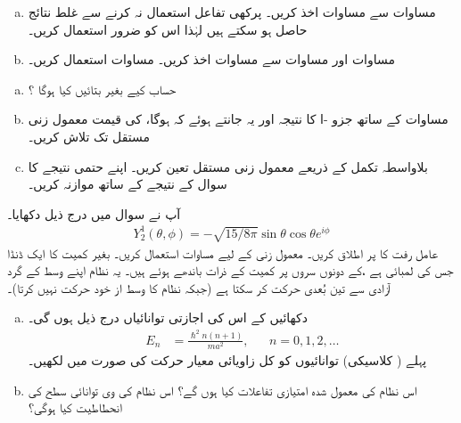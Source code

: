 \begin{enumerate}[a.]
\item
مساوات  سے مساوات   اخذ کریں۔  پرکھی تفاعل  استعمال نہ کرنے سے غلط نتائج حاصل ہو سکتے ہیں لہٰذا اس کو ضرور استعمال کریں۔ 
\item
مساوات  اور مساوات   سے مساوات    اخذ کریں۔   مساوات    استعمال کریں۔ 
\end{enumerate}
\begin{enumerate}[a.]
\item
حساب کیے بغیر بتائیں  کیا ہوگا ؟
\item
مساوات   کے ساتھ جزو -ا  کا نتیجہ اور یہ جانتے ہوئے کہ  ہوگا،   کی  قیمت معمول زنی مستقل    تک تلاش کریں۔ 
\item
بلاواسطہ تکمل کے ذریعے معمول زنی مستقل  تعین کریں۔ اپنے حتمی نتیجے کا سوال  کے نتیجے کے ساتھ موازنہ کریں۔ 
\end{enumerate} 
آپ نے سوال   میں درج ذیل دکھایا۔ 
\begin{align*} 
Y_2^1 (\theta , \phi) = - \sqrt{15/8 \pi} \sin \theta \cos \theta e^{i \phi}
\end{align*}
عامل رفت کا  پر اطلاق کریں۔ معمول زنی کے لیے مساوات   استعمال کریں۔ 
بغیر کمیت کا ایک ڈنڈا جس کی لمبائی  ہے ،کے دونوں سروں پر کمیت   کے ذرات باندھے ہوئے ہیں۔  یہ  نظام اپنے وسط کے گرد آزادی سے تین بُعدی حرکت کر سکتا ہے (جبکہ نظام کا وسط از  خود حرکت نہیں کرتا)۔ 
\begin{enumerate}[a.]
\item
دکھائیں کے اس   کی اجازتی توانائیاں درج ذیل ہوں گی۔ 
\begin{align*}
E_n& = \frac{\hslash^2 n (n + 1)}{m a^2} ,&& n=0,1,2,\dotsc 
\end{align*}
  پہلے ( کلاسیکی) توانائیوں کو کل زاویائی معیار حرکت کی صورت میں لکھیں۔ 
\item
اس نظام کی معمول شدہ امتیازی تفاعلات کیا ہوں گے؟ اس نظام کی  وی توانائی سطح کی انحطاطیت کیا ہوگی؟ 
\end{enumerate}

